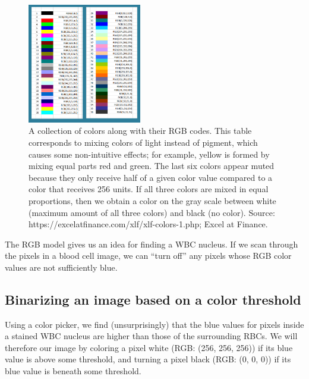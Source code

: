 \begin{figure}[h]
\centering
\mySfFamily
\includegraphics[width = 0.444\textwidth]{../images/RGB_color_chart.png}
\caption{A collection of colors along with their RGB codes. This table corresponds to mixing colors of light instead of pigment, which causes some non-intuitive effects; for example, yellow is formed by mixing equal parts red and green. The last six colors appear muted because they only receive half of a given color value compared to a color that receives 256 units. If all three colors are mixed in equal proportions, then we obtain a color on the gray scale between white (maximum amount of all three colors) and black (no color). Source: https://excelatfinance.com/xlf/xlf-colors-1.php; Excel at Finance.}
\label{fig:RGB_color_chart}
\end{figure}

The RGB model gives us an idea for finding a WBC nucleus. If we scan through the pixels in a blood cell image, we can “turn off” any pixels whose RGB color values are not sufficiently blue.

\begin{qbox}\end{qbox}

\FloatBarrier
{}
\subsection{Binarizing an image based on a color threshold}

Using a color picker, we find (unsurprisingly) that the blue values for pixels inside a stained WBC nucleus are higher than those of the surrounding RBCs. We will therefore  our image by coloring a pixel white (RGB: (256, 256, 256)) if its blue value is above some threshold, and turning a pixel black (RGB: (0, 0, 0)) if its blue value is beneath some threshold.

